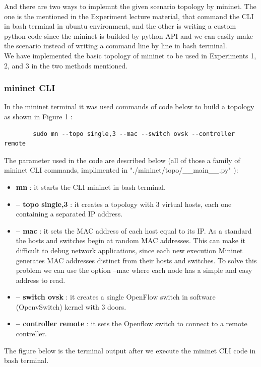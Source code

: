 And there are two ways to implemnt the given scenario topology by mininet. The one is the mentioned in the Experiment lecture material, that command the CLI in bash terminal in ubuntu environment, and the other is writing a custom python code since the mininet is builded by python API and we can easily make the scenario instead of writing a command line by line in bash terminal.\\
We have implemented the basic topology of mininet to be used in Experiments 1, 2, and 3 in the two methods mentioned.
\subsubsection*{mininet CLI}
In the mininet terminal it was used commands of code below to build a topology as shown in Figure 1 :
\begin{center}
    \begin{verbatim}
        sudo mn --topo single,3 --mac --switch ovsk --controller remote
    \end{verbatim}
\end{center}
\vspace{-4mm}
The parameter used in the code are described below (all of those a family of mininet CLI commands, implimented in "./mininet/topo/\_\_main\_\_.py" ):
\begin{itemize}
    \item \textbf{mn} : it starts the CLI mininet in bash terminal.
    \item \textbf{-- topo single,3} : it creates a topology with 3 virtual hosts, each one containing a separated IP address.
    \item \textbf{-- mac} : it sets the MAC address of each host equal to its IP. As a standard the hosts and switches begin at random MAC addresses. This can make it difficult to debug network applications, since each new execution Mininet generates MAC addresses distinct from their hosts and switches. To solve this problem we can use the option --mac where each node has a simple and easy address to read.
    \item \textbf{-- switch ovsk} : it creates a single OpenFlow switch in software (OpenvSwitch) kernel with 3 doors.
    \item \textbf{-- controller remote} : it sets the Openflow switch to connect to a remote contreller.
\end{itemize}
The figure below is the terminal output after we execute the mininet CLI code in bash terminal.\\
